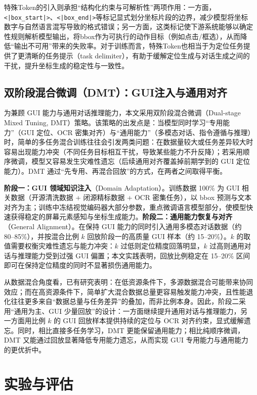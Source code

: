 特殊Token的引入则承担“结构化约束与可解析性”两项作用：一方面，\texttt{<|box\_start|>}、\texttt{<|box\_end|>}等标记显式划分坐标片段的边界，减少模型将坐标数字与自然语言混写导致的格式错误；另一方面，这类标记使下游系统能够以确定性规则解析模型输出，将bbox作为可执行的动作目标（例如点击/框选），从而降低“输出不可用”带来的失败率。对于训练而言，特殊Token也相当于为定位任务提供了更清晰的任务提示（task delimiter），有助于缓解定位生成与对话生成之间的干扰，提升坐标生成的稳定性与一致性。

\subsection{双阶段混合微调（DMT）：GUI注入与通用对齐}
为兼顾 GUI 能力与通用对话推理能力，本文采用双阶段混合微调（Dual-stage Mixed Tuning, DMT）策略\citep{bai2025qwen25vl}。该策略的出发点是：当模型同时学习“专用能力”（GUI 定位、OCR 密集对齐）与“通用能力”（多模态对话、指令遵循与推理）时，简单的多任务混合训练往往会引发两类问题：在数据量较大或任务差异较大时容易出现能力冲突（不同任务目标相互干扰，导致某些能力不升反降）；若采用顺序微调，模型又容易发生灾难性遗忘（后续通用对齐覆盖掉前期学到的 GUI 定位能力）。DMT 通过“先专用、再混合回放”的方式，在两者之间取得平衡。

\textbf{阶段一：GUI 领域知识注入}（Domain Adaptation）。训练数据 100\% 为 GUI 相关数据（开源清洗数据 + 闭源精标数据 + OCR 密集任务），以 bbox 预测与文本对齐为主；训练中冻结视觉编码器大部分参数，重点微调语言模型部分，使模型快速获得稳定的屏幕元素感知与坐标生成能力。\textbf{阶段二：通用能力恢复与对齐}（General Alignment）。在保持 GUI 能力的同时引入通用多模态对话数据（约 80--85\%），并按混合比例 $k$ 回放阶段一的高质量 GUI 样本（约 15--20\%）。$k$ 的取值需要权衡灾难性遗忘与能力冲突：$k$ 过低则定位精度回落明显，$k$ 过高则通用对话与推理能力受到过强 GUI 偏置；本文实践表明，回放比例稳定在 15--20\% 区间即可在保持定位精度的同时不显著损伤通用能力。

从数据混合角度看，已有研究表明：在低资源条件下，多源数据混合可能带来协同效应；而在高资源条件下，简单扩大混合数据总量更容易触发能力冲突，且性能退化往往更多来自“数据总量与任务差异”的叠加，而非比例本身。因此，阶段二采用“通用为主、GUI 少量回放”的设计：一方面继续提升通用对话与推理能力，另一方面用比例 $k$ 的 GUI 回放样本提供持续的定位与 OCR 对齐约束，显式缓解遗忘。同时，相比直接多任务学习，DMT 更能保留通用能力；相比纯顺序微调，DMT 又能通过回放显著降低专用能力遗忘，从而实现 GUI 专用能力与通用能力的更优折中。

\section{实验与评估}
